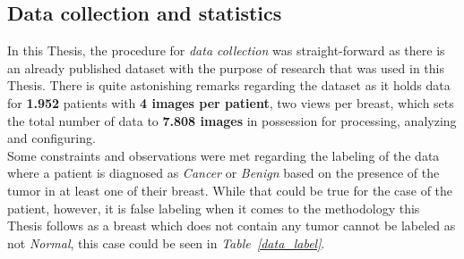 \documentclass[12pt]{extarticle}
\begin{document}
	\subsection{Data collection and statistics}\label{Data_collection}
	In this Thesis, the procedure for \emph{data collection} was straight-forward as there is an already published dataset \cite{Dataset} with the purpose of research that was used in this Thesis. There is quite astonishing remarks regarding the dataset as it holds data for \textbf{1.952} patients with \textbf{4 images per patient}, two views per breast, which sets the total number of data to \textbf{7.808 images} in possession for processing, analyzing and configuring.\\[5mm]
	Some constraints and observations were met regarding the labeling of the data where a patient is diagnosed as \emph{Cancer} or \emph{Benign} based on the presence of the tumor in at least one of their breast. While that could be true for the case of the patient, however, it is false labeling when it comes to the methodology this Thesis follows as a breast which does not contain any tumor cannot be labeled as not \emph{Normal}, this case could be seen in \emph{Table~\ref{data_label}}.
\end{document}
